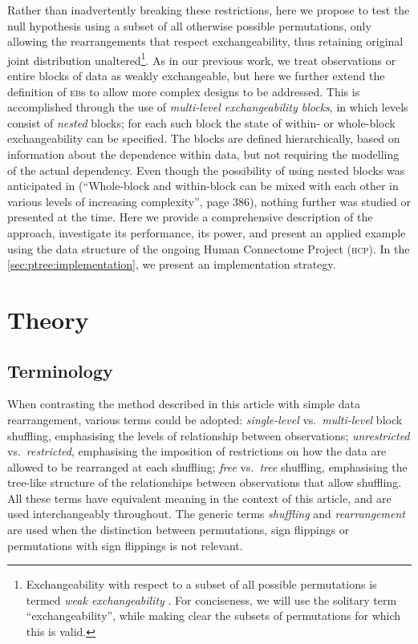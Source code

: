 Rather than inadvertently breaking these restrictions, here we propose to test the null hypothesis using a subset of all otherwise possible permutations, only allowing the rearrangements that respect exchangeability, thus retaining original joint distribution unaltered\footnote{Exchangeability with respect to a subset of all possible permutations is termed \emph{weak exchangeability} \citep{Good2005}. For conciseness, we will use the solitary term ``exchangeability'', while making clear the subsets of permutations for which this is valid.}. As in our previous work, we treat observations or entire blocks of data as weakly exchangeable, but here we further extend the definition of \textsc{eb}s to allow more complex designs to be addressed. This is accomplished through the use of \emph{multi-level exchangeability blocks}, in which levels consist of \emph{nested} blocks; for each such block the state of within- or whole-block exchangeability can be specified. The blocks are defined hierarchically, based on information about the dependence within data, but not requiring the modelling of the actual dependency. Even though the possibility of using nested blocks was anticipated in \citet{Winkler2014} (``Whole-block and within-block can be mixed with each other in various levels of increasing complexity'', page 386), nothing further was studied or presented at the time. Here we provide a comprehensive description of the approach, investigate its performance, its power, and present an applied example using the data structure of the ongoing Human Connectome Project (\textsc{hcp}). In the \ref{sec:ptree:implementation}, we present an implementation strategy.

\section{Theory}

\subsection{Terminology}

When contrasting the method described in this article with simple data rearrangement, various terms could be adopted: \emph{single-level} vs.\ \emph{multi-level} block shuffling, emphasising the levels of relationship between observations; \emph{unrestricted} vs.\ \emph{restricted}, emphasising the imposition of restrictions on how the data are allowed to be rearranged at each shuffling; \emph{free} vs.\ \emph{tree} shuffling, emphasising the tree-like structure of the relationships between observations that allow shuffling. All these terms have equivalent meaning in the context of this article, and are used interchangeably throughout. The generic terms \emph{shuffling} and \emph{rearrangement} are used when the distinction between permutations, sign flippings or permutations with sign flippings is not relevant.

